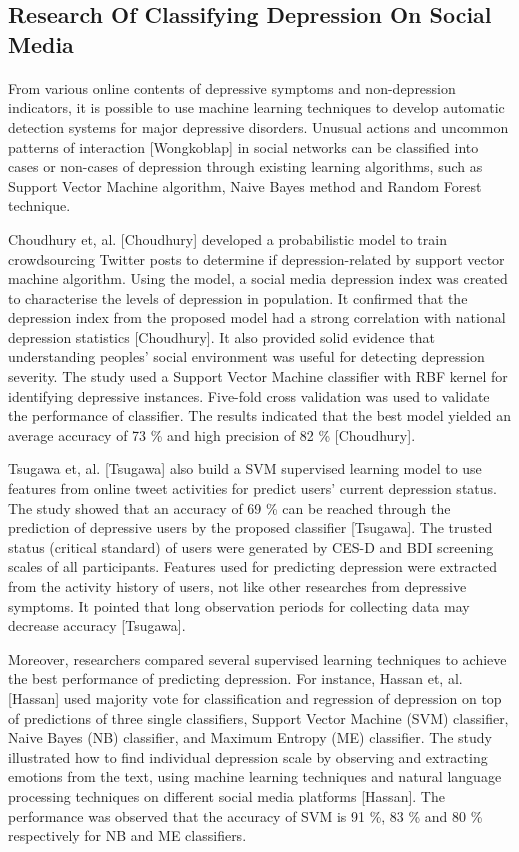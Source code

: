 \documentclass[runningheads]{llncs}
\begin{document}
\subsection{Research Of Classifying Depression On Social Media}
%
%
\paragraph{}
From various online contents of depressive symptoms and non-depression indicators, it is possible to use machine learning techniques to develop automatic detection systems for major depressive disorders. Unusual actions and uncommon patterns of interaction [Wongkoblap] in social networks can be classified into cases or non-cases of depression through existing learning algorithms,  such as Support Vector Machine algorithm, Naive Bayes method and Random Forest technique.

Choudhury et, al. [Choudhury] developed a probabilistic model to train crowdsourcing Twitter posts to determine if depression-related by support vector machine algorithm. Using the model, a social media depression index was created to characterise the levels of depression in population. It confirmed that the depression index from the proposed model had a strong correlation with national depression statistics [Choudhury]. It also provided solid evidence that understanding peoples' social environment was useful for detecting depression severity. The study used a Support Vector Machine classifier with RBF kernel for identifying depressive instances. Five-fold cross validation was used to validate the performance of classifier. The results indicated that the best model yielded an average accuracy of 73 \% and high precision of 82 \% [Choudhury].   

Tsugawa et, al. [Tsugawa] also build a SVM supervised learning model to use features from online tweet activities for predict users' current depression status. The study showed that an accuracy of 69 \% can be reached through the prediction of depressive users by the proposed classifier [Tsugawa]. The trusted status (critical standard) of users were generated by CES-D and BDI screening scales of all participants. Features used for predicting depression were extracted from the activity history of users, not like other researches from depressive symptoms. It pointed that long observation periods for collecting data may decrease accuracy [Tsugawa].  

Moreover, researchers compared several supervised learning techniques to achieve the best performance of predicting depression. For instance, Hassan et, al. [Hassan] used majority vote for classification and regression of depression on top of predictions of three single classifiers, Support Vector Machine (SVM) classifier, Naive Bayes (NB) classifier, and Maximum Entropy (ME) classifier. The study illustrated how to find individual depression scale by observing and extracting emotions from the text, using machine learning techniques and natural language processing techniques on different social media platforms [Hassan]. The performance was observed that the accuracy of SVM is 91 \%,  83 \% and 80 \% respectively for NB and ME classifiers.
\end{document}
